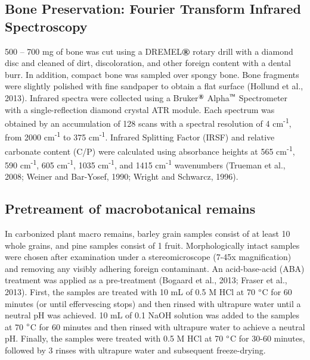 \documentclass[5p]{elsarticle} %
\begin{document}
\hypertarget{bone-preservation-fourier-transform-infrared-spectroscopy}{%
\subsection{Bone Preservation: Fourier Transform Infrared Spectroscopy}\label{bone-preservation-fourier-transform-infrared-spectroscopy}}

500 -- 700 mg of bone was cut using a DREMEL\(\text{\textregistered}\) rotary drill with a diamond disc and cleaned of dirt, discoloration, and other foreign content with a dental burr. In addition, compact bone was sampled over spongy bone. Bone fragments were slightly polished with fine sandpaper to obtain a flat surface (Hollund et al., 2013). Infrared spectra were collected using a Bruker\(^\text{\textregistered}\) Alpha\(^\text{\texttrademark}\) Spectrometer with a single-reflection diamond crystal ATR module. Each spectrum was obtained by an accumulation of 128 scans with a spectral resolution of 4 cm\textsuperscript{-1}, from 2000 cm\textsuperscript{-1} to 375 cm\textsuperscript{-1}. Infrared Splitting Factor (IRSF) and relative carbonate content (C/P) were calculated using absorbance heights at 565 cm\textsuperscript{-1}, 590 cm\textsuperscript{-1}, 605 cm\textsuperscript{-1}, 1035 cm\textsuperscript{-1}, and 1415 cm\textsuperscript{-1} wavenumbers (Trueman et al., 2008; Weiner and Bar-Yosef, 1990; Wright and Schwarcz, 1996).

\hypertarget{pretreament-of-macrobotanical-remains}{%
\subsection{Pretreament of macrobotanical remains}\label{pretreament-of-macrobotanical-remains}}

In carbonized plant macro remains, barley grain samples consist of at least 10 whole grains, and pine samples consist of 1 fruit. Morphologically intact samples were chosen after examination under a stereomicroscope (7-45x magnification) and removing any visibly adhering foreign contaminant. An acid-base-acid (ABA) treatment was applied as a pre-treatment (Bogaard et al., 2013; Fraser et al., 2013). First, the samples are treated with 10 mL of 0.5 M HCl at 70 \(\text{\textdegree}\)C for 60 minutes (or until effervescing stops) and then rinsed with ultrapure water until a neutral pH was achieved. 10 mL of 0.1 NaOH solution was added to the samples at 70 \(\text{\textdegree}\)C for 60 minutes and then rinsed with ultrapure water to achieve a neutral pH. Finally, the samples were treated with 0.5 M HCl at 70 \(\text{\textdegree}\)C for 30-60 minutes, followed by 3 rinses with ultrapure water and subsequent freeze-drying.
\end{document}
